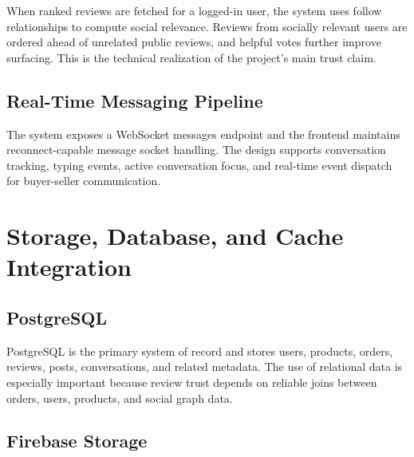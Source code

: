 \documentclass[12pt,letterpaper]{report}
\begin{document}
When ranked reviews are fetched for a logged-in user, the system uses follow relationships to compute social relevance. Reviews from socially relevant users are ordered ahead of unrelated public reviews, and helpful votes further improve surfacing. This is the technical realization of the project's main trust claim.


\subsection{Real-Time Messaging Pipeline}

The system exposes a WebSocket messages endpoint and the frontend maintains reconnect-capable message socket handling. The design supports conversation tracking, typing events, active conversation focus, and real-time event dispatch for buyer-seller communication.


\section{Storage, Database, and Cache Integration}

\subsection{PostgreSQL}

PostgreSQL is the primary system of record and stores users, products, orders, reviews, posts, conversations, and related metadata. The use of relational data is especially important because review trust depends on reliable joins between orders, users, products, and social graph data.

\subsection{Firebase Storage}
\end{document}
